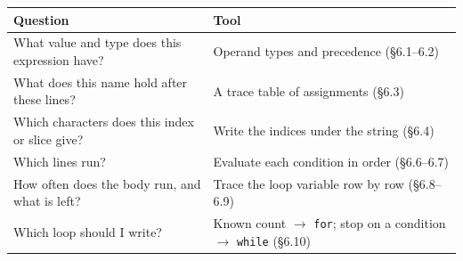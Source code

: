 \documentclass[11pt]{article}
\begin{document}
\begin{keepsection}
\begin{center}\small\begin{tabularx}{\linewidth}{>{\raggedright\arraybackslash}X>{\raggedright\arraybackslash}X}\toprule
\textbf{Question} & \textbf{Tool} \\ \midrule
What value and type does this expression have? & Operand types and precedence (§6.1–6.2) \\
What does this name hold after these lines? & A trace table of assignments (§6.3) \\
Which characters does this index or slice give? & Write the indices under the string (§6.4) \\
Which lines run? & Evaluate each condition in order (§6.6–6.7) \\
How often does the body run, and what is left? & Trace the loop variable row by row (§6.8–6.9) \\
Which loop should I write? & Known count \ensuremath{\to} \texttt{for}; stop on a condition \ensuremath{\to} \texttt{while} (§6.10) \\
\bottomrule\end{tabularx}\end{center}
\end{keepsection}
\end{document}
